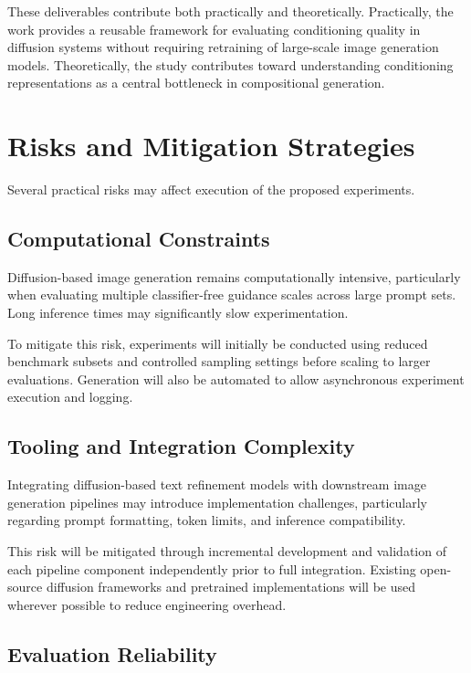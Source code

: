 \documentclass[a4paper,twoside,12pt]{report}
\begin{document}
These deliverables contribute both practically and theoretically. Practically, the work provides a reusable framework for evaluating conditioning quality in diffusion systems without requiring retraining of large-scale image generation models. Theoretically, the study contributes toward understanding conditioning representations as a central bottleneck in compositional generation.

\section{Risks and Mitigation Strategies}

Several practical risks may affect execution of the proposed experiments.

\subsection{Computational Constraints}

Diffusion-based image generation remains computationally intensive, particularly when evaluating multiple classifier-free guidance scales across large prompt sets. Long inference times may significantly slow experimentation.

To mitigate this risk, experiments will initially be conducted using reduced benchmark subsets and controlled sampling settings before scaling to larger evaluations. Generation will also be automated to allow asynchronous experiment execution and logging.

\subsection{Tooling and Integration Complexity}

Integrating diffusion-based text refinement models with downstream image generation pipelines may introduce implementation challenges, particularly regarding prompt formatting, token limits, and inference compatibility.

This risk will be mitigated through incremental development and validation of each pipeline component independently prior to full integration. Existing open-source diffusion frameworks and pretrained implementations will be used wherever possible to reduce engineering overhead.

\subsection{Evaluation Reliability}
\end{document}
